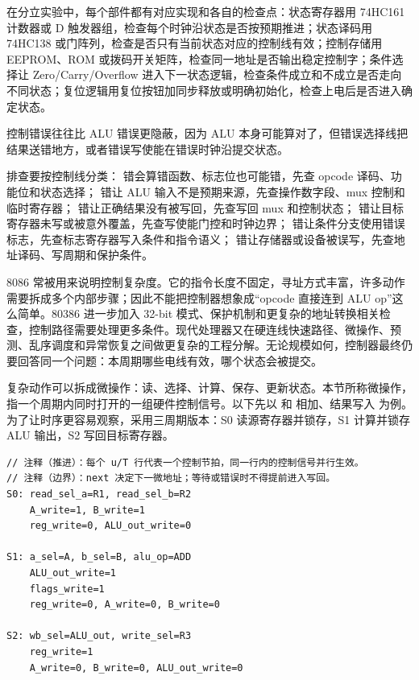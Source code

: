 在分立实验中，每个部件都有对应实现和各自的检查点：状态寄存器用 74HC161 计数器或 D 触发器组，检查每个时钟沿状态是否按预期推进；状态译码用 74HC138 或门阵列，检查是否只有当前状态对应的控制线有效；控制存储用 EEPROM、ROM 或拨码开关矩阵，检查同一地址是否输出稳定控制字；条件选择让 Zero/Carry/Overflow 进入下一状态逻辑，检查条件成立和不成立是否走向不同状态；复位逻辑用复位按钮加同步释放或明确初始化，检查上电后是否进入确定状态。

控制错误往往比 ALU 错误更隐蔽，因为 ALU 本身可能算对了，但错误选择线把结果送错地方，或者错误写使能在错误时钟沿提交状态。

排查要按控制线分类： 错会算错函数、标志位也可能错，先查 opcode 译码、功能位和状态选择； 错让 ALU 输入不是预期来源，先查操作数字段、mux 控制和临时寄存器； 错让正确结果没有被写回，先查写回 mux 和控制状态； 错让目标寄存器未写或被意外覆盖，先查写使能门控和时钟边界； 错让条件分支使用错误标志，先查标志寄存器写入条件和指令语义； 错让存储器或设备被误写，先查地址译码、写周期和保护条件。

8086 常被用来说明控制复杂度。它的指令长度不固定，寻址方式丰富，许多动作需要拆成多个内部步骤；因此不能把控制器想象成“opcode 直接连到 ALU op”这么简单。80386 进一步加入 32-bit 模式、保护机制和更复杂的地址转换相关检查，控制路径需要处理更多条件。现代处理器又在硬连线快速路径、微操作、预测、乱序调度和异常恢复之间做更复杂的工程分解。无论规模如何，控制器最终仍要回答同一个问题：本周期哪些电线有效，哪个状态会被提交。


复杂动作可以拆成微操作：读、选择、计算、保存、更新状态。本节所称微操作，指一个周期内同时打开的一组硬件控制信号。以下先以  和  相加、结果写入  为例。为了让时序更容易观察，采用三周期版本：S0 读源寄存器并锁存，S1 计算并锁存 ALU 输出，S2 写回目标寄存器。

\begin{lstlisting}
// 注释（推进）：每个 u/T 行代表一个控制节拍，同一行内的控制信号并行生效。
// 注释（边界）：next 决定下一微地址；等待或错误时不得提前进入写回。
S0: read_sel_a=R1, read_sel_b=R2
    A_write=1, B_write=1
    reg_write=0, ALU_out_write=0

S1: a_sel=A, b_sel=B, alu_op=ADD
    ALU_out_write=1
    flags_write=1
    reg_write=0, A_write=0, B_write=0

S2: wb_sel=ALU_out, write_sel=R3
    reg_write=1
    A_write=0, B_write=0, ALU_out_write=0
\end{lstlisting}

